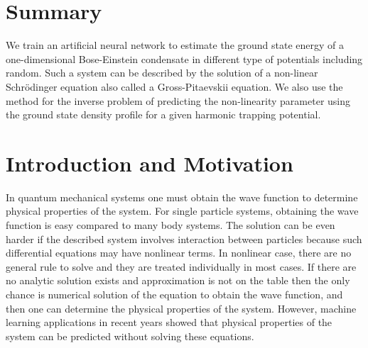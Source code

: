 \documentclass[a4paper,times,hidelinks,12pt]{article}
\begin{document}
\setcounter{page}{1}

\section*{Summary}

We train an artificial neural network to estimate the ground state energy
of a one-dimensional Bose-Einstein condensate in different type of potentials including random.
Such a system can be described by the solution of a non-linear Schr{\"o}dinger equation also called a Gross-Pitaevskii equation. We also use the method for the inverse problem of predicting the non-linearity parameter using the ground
state density profile for a given harmonic trapping potential.

\newpage
\tableofcontents

\newpage

\section{Introduction and Motivation}


\label{sec:Intro}



In quantum mechanical systems one must obtain the wave function to determine physical properties of the system. For single particle systems, obtaining the wave function is easy compared to many body systems. The solution can be even harder if the described system involves interaction between particles because such differential equations may have nonlinear terms. In nonlinear case, there are no general rule to solve and they are treated individually in most cases. If there are no analytic solution exists and approximation is not on the table then the only chance is numerical solution of the equation to obtain the wave function, and then one can determine the physical properties of the system. However, machine learning applications in recent years showed that physical properties of the system can be predicted without solving these equations. \\
\end{document}

